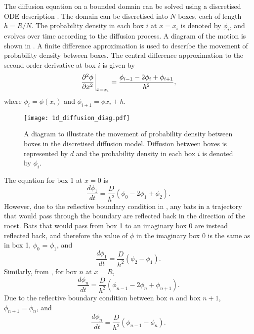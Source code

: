  The diffusion equation on a bounded domain can be solved using a discretised ODE description \cite{woolley2011stochastic}. The domain can be discretised into $N$ boxes, each of length
 $h=R/N$. The probability density in each box $i$ at $x=x_i$ is denoted by $\phi_i$, and evolves over time according to the diffusion process. A diagram of the motion is shown in . A finite difference approximation is used to describe the movement of probability density between boxes. The central difference approximation to the second order derivative at box $i$ is given by
 \begin{equation}
  \left.\frac{\partial^2 \phi}{\partial x^2}\right|_{x=x_i}= \frac{\phi_{i-1}-2\phi_i+\phi_{i+1}}{h^2}, \label{eqn:diffusion_discrete1di}
 \end{equation}
 where $\phi_i=\phi(x_i)$ and $\phi_{i \pm 1}=\phi{x_i \pm h}$.
%
 \begin{figure} [t]
     \centering
         \texttt{[image: 1d\_diffusion\_diag.pdf]}
         \caption{A diagram to illustrate the movement of probability density between boxes in the discretised diffusion model. Diffusion between boxes is represented by $d$ and the probability density in each box $i$ is denoted by $\phi_i$.}
     \label{fig:diffusion_diagram1d}
 \end{figure}
%

 The equation for box 1 at $x = 0$ is
 \begin{equation}
 \frac{d\phi_1}{dt} = \frac{D}{h^2}(\phi_{0}-2\phi_1 +\phi_{2}).
 \end{equation}
 However, due to the reflective boundary condition in , any bats in a trajectory that would pass through the boundary are reflected back in the direction of the roost. Bats that would pass from box 1 to an imaginary box 0 are instead reflected back, and therefore the value of $\phi$ in the imaginary box 0 is the same as in box 1, $\phi_0$ = $\phi_1$, and
 \begin{equation}
 \frac{d\phi_1}{dt} = \frac{D}{h^2}(\phi_{2}- \phi_1).
         \label{eqn:box_1}
 \end{equation}
%
 Similarly, from , for box $n$ at $x=R$,
 \begin{equation}
 \frac{d\phi_n}{dt} = \frac{D}{h^2}(\phi_{n-1}-2\phi_n +\phi_{n+1}).
 \end{equation}
 Due to the reflective boundary condition between box $n$ and box $n+1$, $\phi_{n+1} = \phi_n$, and
 \begin{equation}
 \frac{d\phi_n}{dt} = \frac{D}{h^2}(\phi_{n-1}-\phi_n).
         \label{eqn:annulus_n1d}
 \end{equation}


